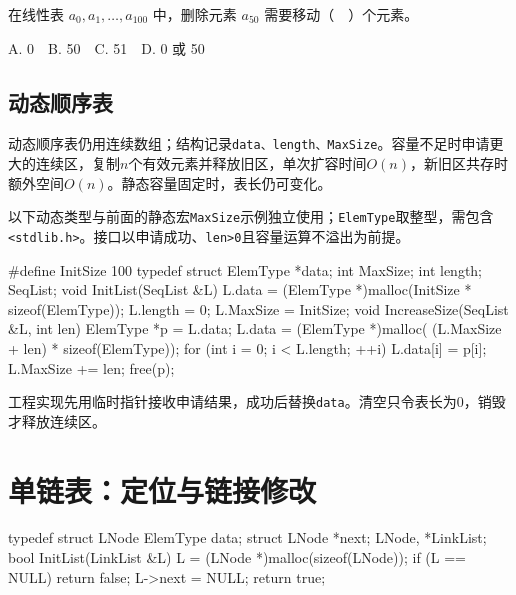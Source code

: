在线性表 \(a_0,a_1,\ldots,a_{100}\) 中，删除元素 \(a_{50}\) 需要移动（　）个元素。

A. 0　B. 50　C. 51　D. 0 或 50

\subsection{动态顺序表}\label{DS02-dynamic}

动态顺序表仍用连续数组；结构记录\texttt{data、length、MaxSize}。容量不足时申请更大的连续区，复制\(n\)个有效元素并释放旧区，单次扩容时间\(O(n)\)，新旧区共存时额外空间\(O(n)\)。静态容量固定时，表长仍可变化。

以下动态类型与前面的静态宏\texttt{MaxSize}示例独立使用；\texttt{ElemType}取整型，需包含\texttt{<\allowbreak{}stdlib.\allowbreak{}h>\allowbreak{}}。接口以申请成功、\texttt{len>\allowbreak{}0}且容量运算不溢出为前提。

\par\smallskip\noindent\begin{minipage}{\linewidth}
\begin{codeblock}[language={C++}]
#define InitSize 100
typedef struct {
    ElemType *data;
    int MaxSize;
    int length;
} SeqList;
void InitList(SeqList &L) {
    L.data = (ElemType *)malloc(InitSize * sizeof(ElemType));
    L.length = 0;
    L.MaxSize = InitSize;
}
void IncreaseSize(SeqList &L, int len) {
    ElemType *p = L.data;
    L.data = (ElemType *)malloc(
        (L.MaxSize + len) * sizeof(ElemType));
    for (int i = 0; i < L.length; ++i)
        L.data[i] = p[i];
    L.MaxSize += len;
    free(p);
}
\end{codeblock}
\end{minipage}\par\smallskip

工程实现先用临时指针接收申请结果，成功后替换\texttt{data}。清空只令表长为0，销毁才释放连续区。

\section{单链表：定位与链接修改}\label{DS02-linked}

\par\smallskip\noindent\begin{minipage}{\linewidth}
\begin{codeblock}[language={C++}]
typedef struct LNode {
    ElemType data;
    struct LNode *next;
} LNode, *LinkList;
bool InitList(LinkList &L) {
    L = (LNode *)malloc(sizeof(LNode));
    if (L == NULL) return false;
    L->next = NULL;
    return true;
}
\end{codeblock}
\end{minipage}\par\smallskip

